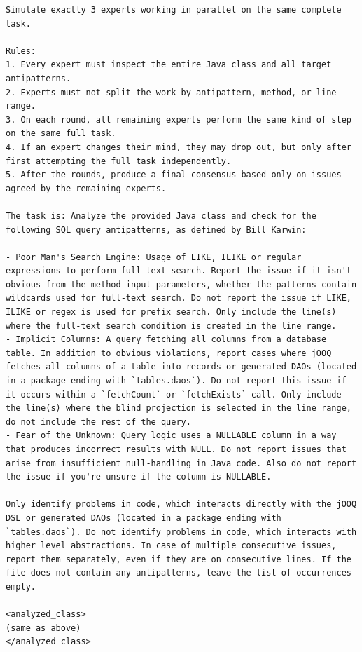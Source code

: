 \nopagebreak
\begin{minipage}{\linewidth}
\end{minipage}


\captionsetup{type=figure}
\begin{lstlisting}[frame=none, basicstyle=\small, breaklines=true, breakatwhitespace=false, breakindent=0pt]
Simulate exactly 3 experts working in parallel on the same complete task.

Rules:
1. Every expert must inspect the entire Java class and all target antipatterns.
2. Experts must not split the work by antipattern, method, or line range.
3. On each round, all remaining experts perform the same kind of step on the same full task.
4. If an expert changes their mind, they may drop out, but only after first attempting the full task independently.
5. After the rounds, produce a final consensus based only on issues agreed by the remaining experts.

The task is: Analyze the provided Java class and check for the following SQL query antipatterns, as defined by Bill Karwin:

- Poor Man's Search Engine: Usage of LIKE, ILIKE or regular expressions to perform full-text search. Report the issue if it isn't obvious from the method input parameters, whether the patterns contain wildcards used for full-text search. Do not report the issue if LIKE, ILIKE or regex is used for prefix search. Only include the line(s) where the full-text search condition is created in the line range.
- Implicit Columns: A query fetching all columns from a database table. In addition to obvious violations, report cases where jOOQ fetches all columns of a table into records or generated DAOs (located in a package ending with `tables.daos`). Do not report this issue if it occurs within a `fetchCount` or `fetchExists` call. Only include the line(s) where the blind projection is selected in the line range, do not include the rest of the query.
- Fear of the Unknown: Query logic uses a NULLABLE column in a way that produces incorrect results with NULL. Do not report issues that arise from insufficient null-handling in Java code. Also do not report the issue if you're unsure if the column is NULLABLE.

Only identify problems in code, which interacts directly with the jOOQ DSL or generated DAOs (located in a package ending with `tables.daos`). Do not identify problems in code, which interacts with higher level abstractions. In case of multiple consecutive issues, report them separately, even if they are on consecutive lines. If the file does not contain any antipatterns, leave the list of occurrences empty.

<analyzed_class>
(same as above)
</analyzed_class>
\end{lstlisting}
\nopagebreak
\begin{minipage}{\linewidth}
\end{minipage}

